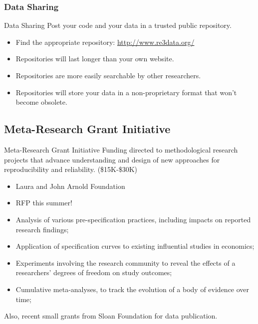 \documentclass{beamer}
\begin{document}
\subsubsection*{Data Sharing}
\begin{frame}{Data Sharing}
Post your code and your data in a trusted public repository.
\begin{itemize}[<.->]
\item
Find the appropriate repository: \url{http://www.re3data.org/}
\item
Repositories will last longer than your own website.
\item
Repositories are more easily searchable by other researchers.
\item
Repositories will store your data in a non-proprietary format that won't become obsolete.
\end{itemize}
\end{frame}
\subsection{Meta-Research Grant Initiative}
\begin{frame}{Meta-Research Grant Initiative}
Funding directed to methodological research projects that advance understanding and design of new approaches for reproducibility and reliability. (\$15K-\$30K)
\begin{itemize}
\item Laura and John Arnold Foundation
\item RFP this summer!
\item Analysis of various pre-specification practices, including impacts on reported research findings;
\item Application of specification curves to existing influential studies in economics;
\item Experiments involving the research community to reveal the effects of a researchers’ degrees of freedom on study outcomes;
\item Cumulative meta-analyses, to track the evolution of a body of evidence over time;
\end{itemize}

Also, recent small grants from Sloan Foundation for data publication.

\end{frame}

\end{document}
